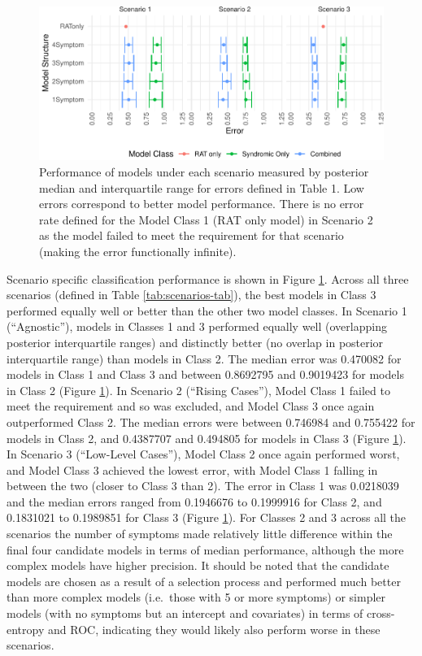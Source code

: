 \documentclass[]{elsarticle} %
\begin{document}
\begin{figure}
\includegraphics[width=1\linewidth]{0501_MainText_files/figure-latex/scenario-plot-1} \caption{Performance of models under each scenario measured by posterior median and interquartile range for errors defined in Table 1. Low errors correspond to better model performance. There is no error rate defined for the Model Class 1 (RAT only model) in Scenario 2 as the model failed to meet the requirement for that scenario (making the error functionally infinite).}\label{fig:scenario-plot}
\end{figure}

Scenario specific classification performance is shown in Figure \ref{fig:scenario-plot}.
Across all three scenarios (defined in Table \ref{tab:scenarios-tab}), the best models in Class 3 performed equally well or better than the other two model classes.
In Scenario 1 (``Agnostic''), models in Classes 1 and 3 performed equally well (overlapping posterior interquartile ranges) and distinctly better (no overlap in posterior interquartile range) than models in Class 2.
The median error was 0.470082 for models in Class 1 and Class 3 and between 0.8692795 and 0.9019423 for models in Class 2 (Figure \ref{fig:scenario-plot}).
In Scenario 2 (``Rising Cases''), Model Class 1 failed to meet the requirement and so was excluded, and Model Class 3 once again outperformed Class 2.
The median errors were between 0.746984 and 0.755422 for models in Class 2, and 0.4387707 and 0.494805 for models in Class 3 (Figure \ref{fig:scenario-plot}).
In Scenario 3 (``Low-Level Cases''), Model Class 2 once again performed worst, and Model Class 3 achieved the lowest error, with Model Class 1 falling in between the two (closer to Class 3 than 2).
The error in Class 1 was 0.0218039 and the median errors ranged from 0.1946676 to 0.1999916 for Class 2, and 0.1831021 to 0.1989851 for Class 3 (Figure \ref{fig:scenario-plot}).
For Classes 2 and 3 across all the scenarios the number of symptoms made relatively little difference within the final four candidate models in terms of median performance, although the more complex models have higher precision.
It should be noted that the candidate models are chosen as a result of a selection process and performed much better than more complex models (i.e.~those with 5 or more symptoms) or simpler models (with no symptoms but an intercept and covariates) in terms of cross-entropy and ROC, indicating they would likely also perform worse in these scenarios.
\end{document}
